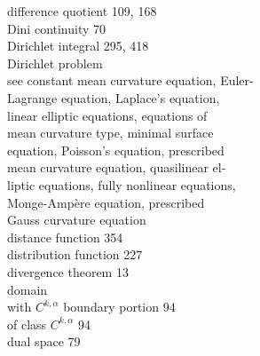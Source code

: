 \begin{flushleft}
difference quotient \hspace{1em} 109, 168\\
Dini continuity \hspace{1em} 70\\
Dirichlet integral \hspace{1em} 295, 418\\
Dirichlet problem\\
\hspace*{1.5em} see constant mean curvature equation, Euler-\\
\hspace*{1.5em} Lagrange equation, Laplace's equation,\\
\hspace*{1.5em} linear elliptic equations, equations of\\
\hspace*{1.5em} mean curvature type, minimal surface\\
\hspace*{1.5em} equation, Poisson's equation, prescribed\\
\hspace*{1.5em} mean curvature equation, quasilinear el-\\
\hspace*{1.5em} liptic equations, fully nonlinear equations,\\
\hspace*{1.5em} Monge-Ampère equation, prescribed\\
\hspace*{1.5em} Gauss curvature equation\\
distance function \hspace{1em} 354\\
distribution function \hspace{1em} 227\\
divergence theorem \hspace{1em} 13\\
domain\\
\hspace*{1.5em} with $C^{k,\alpha}$ boundary portion \hspace{1em} 94\\
\hspace*{1.5em} of class $C^{k,\alpha}$ \hspace{1em} 94\\
dual space \hspace{1em} 79\\[1.8em]


\end{flushleft}
